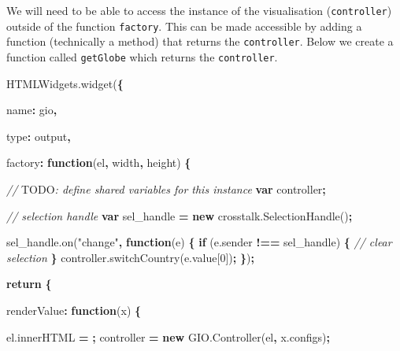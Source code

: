 \documentclass[
]{krantz}
\makeatletter
\newenvironment{Shaded}{\begin{snugshade}}{\end{snugshade}}
\newcommand{\AlertTok}[1]{\textcolor[rgb]{0.33,0.33,0.33}{#1}}
\newcommand{\AttributeTok}[1]{\textcolor[rgb]{0.61,0.61,0.61}{#1}}
\newcommand{\CommentTok}[1]{\textcolor[rgb]{0.37,0.37,0.37}{\textit{#1}}}
\newcommand{\ControlFlowTok}[1]{\textcolor[rgb]{0.27,0.27,0.27}{\textbf{#1}}}
\newcommand{\DataTypeTok}[1]{\textcolor[rgb]{0.27,0.27,0.27}{#1}}
\newcommand{\DecValTok}[1]{\textcolor[rgb]{0.06,0.06,0.06}{#1}}
\newcommand{\KeywordTok}[1]{\textcolor[rgb]{0.27,0.27,0.27}{\textbf{#1}}}
\newcommand{\NormalTok}[1]{#1}
\newcommand{\OperatorTok}[1]{\textcolor[rgb]{0.43,0.43,0.43}{\textbf{#1}}}
\newcommand{\StringTok}[1]{\textcolor[rgb]{0.5,0.5,0.5}{#1}}
\newcommand{\VariableTok}[1]{\textcolor[rgb]{0,0,0}{#1}}
\newenvironment{kframe}{%
\medskip{}
\setlength{\fboxsep}{.8em}
 \def\at@end@of@kframe{}%
 \ifinner\ifhmode%
  \def\at@end@of@kframe{\end{minipage}}%
  \begin{minipage}{\columnwidth}%
 \fi\fi%
 \def\FrameCommand##1{\hskip\@totalleftmargin \hskip-\fboxsep
 \colorbox{shadecolor}{##1}\hskip-\fboxsep
     \hskip-\linewidth \hskip-\@totalleftmargin \hskip\columnwidth}%
 \MakeFramed {\advance\hsize-\width
   \@totalleftmargin\z@ \linewidth\hsize
   \@setminipage}}%
 {\par\unskip\endMakeFramed%
 \at@end@of@kframe}
\renewenvironment{Shaded}{\begin{kframe}}{\end{kframe}}
\makeatother
\begin{document}
We will need to be able to access the instance of the visualisation (\texttt{controller}) outside of the function \texttt{factory}. This can be made accessible by adding a function (technically a method) that returns the \texttt{controller}. Below we create a function called \texttt{getGlobe} which returns the \texttt{controller}.

\begin{Shaded}
\begin{Highlighting}[]
\VariableTok{HTMLWidgets}\NormalTok{.}\AttributeTok{widget}\NormalTok{(}\OperatorTok{\{}

  \DataTypeTok{name}\OperatorTok{:} \StringTok{\textquotesingle{}gio\textquotesingle{}}\OperatorTok{,}

  \DataTypeTok{type}\OperatorTok{:} \StringTok{\textquotesingle{}output\textquotesingle{}}\OperatorTok{,}

  \DataTypeTok{factory}\OperatorTok{:} \KeywordTok{function}\NormalTok{(el}\OperatorTok{,}\NormalTok{ width}\OperatorTok{,}\NormalTok{ height) }\OperatorTok{\{}

    \CommentTok{// }\AlertTok{TODO}\CommentTok{: define shared variables for this instance}
    \KeywordTok{var}\NormalTok{ controller}\OperatorTok{;}

    \CommentTok{// selection handle}
    \KeywordTok{var}\NormalTok{ sel\_handle }\OperatorTok{=} \KeywordTok{new} \VariableTok{crosstalk}\NormalTok{.}\AttributeTok{SelectionHandle}\NormalTok{()}\OperatorTok{;}

    \VariableTok{sel\_handle}\NormalTok{.}\AttributeTok{on}\NormalTok{(}\StringTok{"change"}\OperatorTok{,} \KeywordTok{function}\NormalTok{(e) }\OperatorTok{\{}
      \ControlFlowTok{if}\NormalTok{ (}\VariableTok{e}\NormalTok{.}\AttributeTok{sender} \OperatorTok{!==}\NormalTok{ sel\_handle) }\OperatorTok{\{}
        \CommentTok{// clear selection}
      \OperatorTok{\}}
      \VariableTok{controller}\NormalTok{.}\AttributeTok{switchCountry}\NormalTok{(}\VariableTok{e}\NormalTok{.}\AttributeTok{value}\NormalTok{[}\DecValTok{0}\NormalTok{])}\OperatorTok{;}
    \OperatorTok{\}}\NormalTok{)}\OperatorTok{;}


    \ControlFlowTok{return} \OperatorTok{\{}

      \DataTypeTok{renderValue}\OperatorTok{:} \KeywordTok{function}\NormalTok{(x) }\OperatorTok{\{}

        \VariableTok{el}\NormalTok{.}\AttributeTok{innerHTML} \OperatorTok{=} \StringTok{\textquotesingle{}\textquotesingle{}}\OperatorTok{;}
\NormalTok{        controller }\OperatorTok{=} \KeywordTok{new} \VariableTok{GIO}\NormalTok{.}\AttributeTok{Controller}\NormalTok{(el}\OperatorTok{,} \VariableTok{x}\NormalTok{.}\AttributeTok{configs}\NormalTok{)}\OperatorTok{;}


\end{Highlighting}
\end{Shaded}
\end{document}
